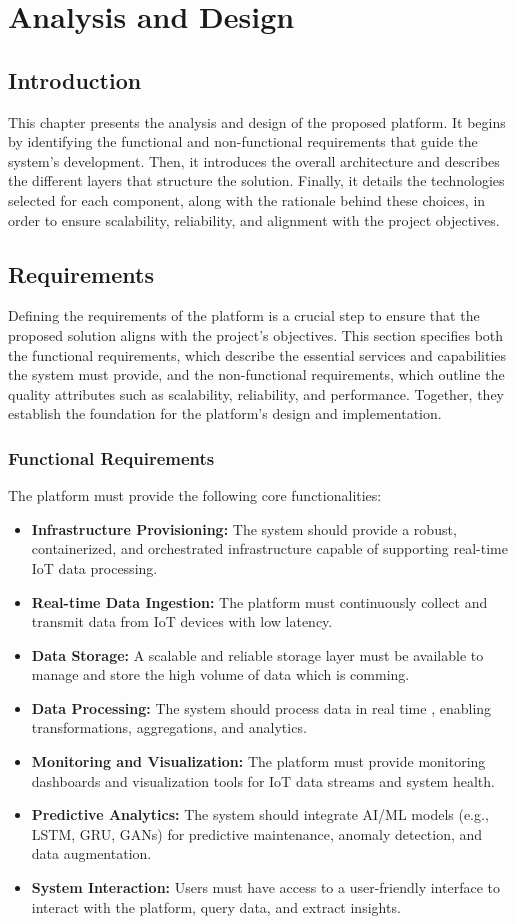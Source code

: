 \chapter{Analysis and Design}
\section{Introduction}
This chapter presents the analysis and design of the proposed platform. It begins by identifying the functional and non-functional requirements that guide the system’s development. Then, it introduces the overall architecture and describes the different layers that structure the solution. Finally, it details the technologies selected for each component, along with the rationale behind these choices, in order to ensure scalability, reliability, and alignment with the project objectives.

\section{Requirements}
Defining the requirements of the platform is a crucial step to ensure that the proposed solution aligns with the project’s objectives. This section specifies both the functional requirements, which describe the essential services and capabilities the system must provide, and the non-functional requirements, which outline the quality attributes such as scalability, reliability, and performance. Together, they establish the foundation for the platform’s design and implementation.
\subsection{Functional Requirements}
The platform must provide the following core functionalities:
\begin{itemize}
\item \textbf{Infrastructure Provisioning:} The system should provide a robust, containerized, and orchestrated infrastructure capable of supporting real-time IoT data processing.
\item \textbf{Real-time Data Ingestion:} The platform must continuously collect and transmit data from IoT devices with low latency.
\item \textbf{Data Storage:} A scalable and reliable storage layer must be available to manage and store the high volume of data which is comming.
\item \textbf{Data Processing:} The system should process data in real time , enabling transformations, aggregations, and analytics.
\item \textbf{Monitoring and Visualization:} The platform must provide monitoring dashboards and visualization tools for IoT data streams and system health.
\item \textbf{Predictive Analytics:} The system should integrate AI/ML models (e.g., LSTM, GRU, GANs) for predictive maintenance, anomaly detection, and data augmentation.
\item \textbf{System Interaction:} Users must have access to a user-friendly interface to interact with the platform, query data, and extract insights.
\end{itemize}

